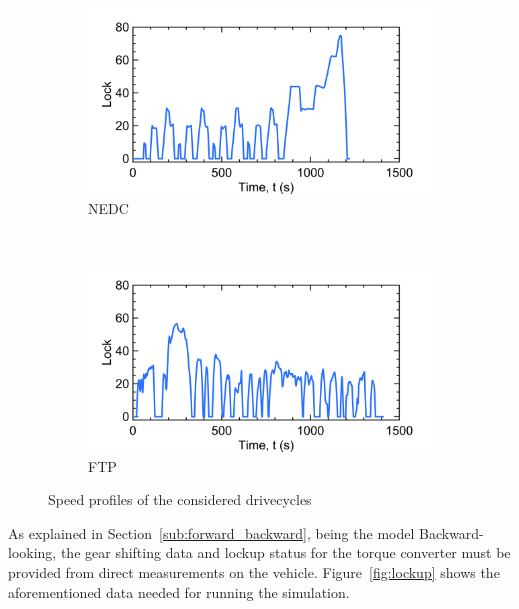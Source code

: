\begin{figure}[ht]
  \centering
  \begin{subfigure}[b]{0.45\textwidth}
    \includegraphics[width=\textwidth]{figures/model/NEDC_plt_speed.png}
    \caption{NEDC}
    \label{fig:NEDC_speed_profile}
  \end{subfigure}
  ~ %
  \begin{subfigure}[b]{0.45\textwidth}
    \includegraphics[width=\textwidth]{figures/model/FTP_plt_speed.png}
    \caption{FTP}
    \label{fig:FTP_speed_profile}
  \end{subfigure}
  \caption{Speed profiles of the considered drivecycles}\label{fig:speed_profile}
\end{figure}

As explained in Section~\ref{sub:forward_backward}, being the model Backward-looking, the gear shifting data and lockup status for the torque converter must be provided from direct measurements on the vehicle. Figure~\ref{fig:lockup} shows the aforementioned data needed for running the simulation.

